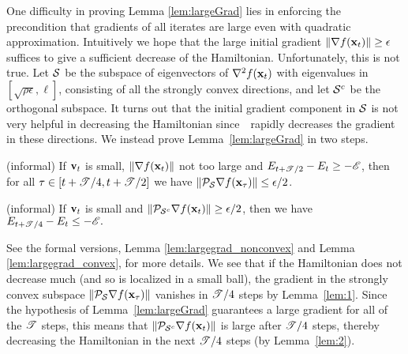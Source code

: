 One difficulty in proving Lemma \ref{lem:largeGrad} lies in enforcing the precondition that gradients of all iterates are large even with quadratic approximation. Intuitively we hope that the large initial gradient $\norm{\grad f(\x_t)}\ge \epsilon$ suffices to give a sufficient decrease of the Hamiltonian. Unfortunately, this is not true. Let $\S$ be the subspace of eigenvectors of $\nabla^2 f (\x_t)$ with eigenvalues in $[\sqrt{\rho\epsilon}, \ell]$, consisting of all the strongly convex directions, and let $\S^c$ be the orthogonal subspace. It turns out that the initial gradient component in $\S$ is not very helpful in decreasing the Hamiltonian since~\nag~rapidly decreases the gradient in these directions. %
We instead prove Lemma~\ref{lem:largeGrad} in two steps.

\begin{lemma}(informal)\label{lem:1}
    If $\v_t$ is small, $\norm{\grad f(\x_t)}$ not too large and $E_{t+\utime/2} - E_t \ge - \ufun$, then for all $\tau\in [t+\utime/4, t+\utime/2]$ we have $\norm{\proj_\S \grad f(\x_\tau)}\le \epsilon/2$.
\end{lemma}

\begin{lemma}(informal)\label{lem:2}
If $\v_t$ is small and $\norm{\proj_{\S^c}\grad f(\x_{t})} \ge \epsilon/2$,
then we have $E_{t+\utime/4} - E_t \le - \ufun.$
\end{lemma}
\noindent See the formal versions, Lemma \ref{lem:largegrad_nonconvex} and Lemma \ref{lem:largegrad_convex}, 
for more details.  We see that if the Hamiltonian does not decrease much (and so is localized in a small ball), 
the gradient in the strongly convex subspace $\norm{\proj_\S \grad f(\x_\tau)}$ vanishes in $\utime/4$ steps by Lemma~\ref{lem:1}. Since the hypothesis of Lemma~\ref{lem:largeGrad} guarantees a large gradient for all of the $\utime$ steps, this means that $\norm{\proj_{\S^c}\grad f(\x_{t})}$ is large after $\utime/4$ steps, thereby decreasing the Hamiltonian in the next $\utime/4$ steps (by Lemma~\ref{lem:2}).


